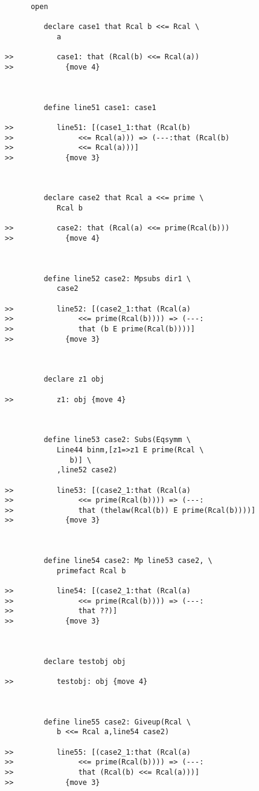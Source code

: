 \documentclass[12pt]{article}
\begin{document}
\begin{verbatim}
      open

         declare case1 that Rcal b <<= Rcal \
            a

>>          case1: that (Rcal(b) <<= Rcal(a))
>>            {move 4}



         define line51 case1: case1

>>          line51: [(case1_1:that (Rcal(b)
>>               <<= Rcal(a))) => (---:that (Rcal(b)
>>               <<= Rcal(a)))]
>>            {move 3}



         declare case2 that Rcal a <<= prime \
            Rcal b

>>          case2: that (Rcal(a) <<= prime(Rcal(b)))
>>            {move 4}



         define line52 case2: Mpsubs dir1 \
            case2

>>          line52: [(case2_1:that (Rcal(a)
>>               <<= prime(Rcal(b)))) => (---:
>>               that (b E prime(Rcal(b))))]
>>            {move 3}



         declare z1 obj

>>          z1: obj {move 4}



         define line53 case2: Subs(Eqsymm \
            Line44 binm,[z1=>z1 E prime(Rcal \
               b)] \
            ,line52 case2)

>>          line53: [(case2_1:that (Rcal(a)
>>               <<= prime(Rcal(b)))) => (---:
>>               that (thelaw(Rcal(b)) E prime(Rcal(b))))]
>>            {move 3}



         define line54 case2: Mp line53 case2, \
            primefact Rcal b

>>          line54: [(case2_1:that (Rcal(a)
>>               <<= prime(Rcal(b)))) => (---:
>>               that ??)]
>>            {move 3}



         declare testobj obj

>>          testobj: obj {move 4}



         define line55 case2: Giveup(Rcal \
            b <<= Rcal a,line54 case2)

>>          line55: [(case2_1:that (Rcal(a)
>>               <<= prime(Rcal(b)))) => (---:
>>               that (Rcal(b) <<= Rcal(a)))]
>>            {move 3}




\end{verbatim}
\end{document}
